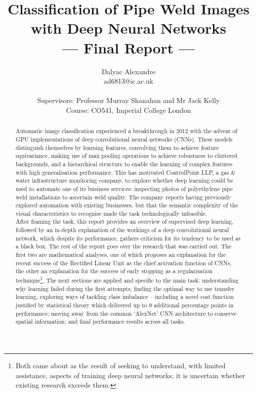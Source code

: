 \documentclass[a4paper,11pt]{article}
\title{Classification of Pipe Weld Images with Deep Neural Networks\\\Large{--- Final Report ---}}
\author{Dalyac Alexandre\\
       ad6813@ic.ac.uk\\ \\
       \small{Supervisors: Professor Murray Shanahan and Mr Jack Kelly}\\
       \small{Course: CO541, Imperial College London}
}
\begin{document}
\maketitle

\begin{abstract}

{
Automatic image classification experienced a breakthrough in 2012 with the advent of GPU implementations of deep convolutional neural networks (CNNs). These models distinguish themselves by learning features, convolving them to achieve feature equivariance, making use of max pooling operations to achieve robustness to cluttered backgrounds, and a hierarchical structure to enable the learning of complex features with high generalisation performance. This has motivated ControlPoint LLP, a gas \& water infrastructure monitoring company, to explore whether deep learning could be used to automate one of its business services: inspecting photos of polyethylene pipe weld installations to ascertain weld quality. The company reports having previously explored automation with existing businesses, but that the semantic complexity of the visual characteristics to recognise made the task technologically infeasible. \\

After framing the task, this report provides an overview of supervised deep learning, followed by an in-depth explanation of the workings of a deep convolutional neural network, which despite its performance, gathers criticism for its tendency to be used as a black box. The rest of the report goes over the research that was carried out. The first two are mathematical analyses, one of which proposes an explanation for the recent success of the Rectified Linear Unit as the chief activation function of CNNs, the other an explanation for the success of early stopping as a regularisation technique\footnote{Both came about as the result of seeking to understand, with limited assistance, aspects of training deep neural networks; it is uncertain whether existing research exceeds them.}. The next sections are applied and specific to the main task: understanding why learning failed during the first attempts; finding the optimal way to use transfer learning, exploring ways of tackling class imbalance -- including a novel cost function justified by statistical theory which delivered up to 9 additional percentage points in performance; moving away from the common `AlexNet' CNN architecture to conserve spatial information; and final performance results across all tasks.
}
\end{abstract}
\end{document}
